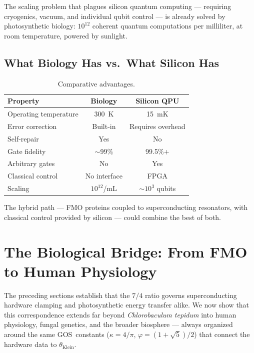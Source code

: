 \documentclass[11pt,twocolumn]{article}
\begin{document}
The scaling problem that plagues silicon quantum computing --- requiring
cryogenics, vacuum, and individual qubit control ---
is already solved by photosynthetic biology: $10^{12}$ coherent quantum
computations per milliliter, at room temperature, powered by sunlight.

\subsection{What Biology Has vs.\ What Silicon Has}

\begin{table}[H]
\centering
\caption{Comparative advantages.}
\label{tab:compare}
\begin{tabular}{@{}lcc@{}}
\toprule
Property & Biology & Silicon QPU \\
\midrule
Operating temperature & 300~K & 15~mK \\
Error correction & Built-in & Requires overhead \\
Self-repair & Yes & No \\
Gate fidelity & $\sim$99\% & 99.5\%+ \\
Arbitrary gates & No & Yes \\
Classical control & No interface & FPGA \\
Scaling & $10^{12}$/mL & $\sim 10^3$ qubits \\
\bottomrule
\end{tabular}
\end{table}

The hybrid path --- FMO proteins coupled to superconducting resonators,
with classical control provided by silicon --- could combine the best of
both.

\section{The Biological Bridge: From FMO to Human Physiology}
\label{sec:bio}

The preceding sections establish that the $7/4$ ratio governs
superconducting hardware clamping and photosynthetic energy transfer
alike.  We now show that this correspondence extends far beyond
\textit{Chlorobaculum tepidum} into human physiology, fungal genetics,
and the broader biosphere --- always organized around the same
GOS~constants ($\kappa = 4/\pi$, $\varphi = (1+\sqrt{5})/2$) that
connect the hardware data to $\theta_{\mathrm{Klein}}$.
\end{document}
